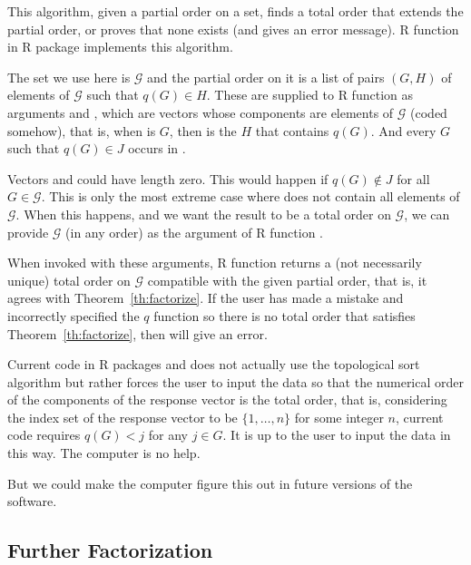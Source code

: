 This algorithm, given a partial order on a set, finds a total order that
extends the partial order, or proves that none exists (and gives an error
message).
R function  in R package 
\citep{pooh-package} implements this algorithm.

The set we use here is $\mathcal{G}$ and the partial order on it is
a list of pairs $(G, H)$ of elements of $\mathcal{G}$ such that
$q(G) \in H$.  These are supplied to R function  as arguments
 and , which are vectors whose components are elements
of $\mathcal{G}$ (coded somehow), that is, when 
is $G$, then  is the $H$ that contains $q(G)$.
And every $G$ such that $q(G) \in J$ occurs in .

Vectors  and  could have length zero.  This would happen
if $q(G) \notin J$ for all $G \in \mathcal{G}$.  This is only the most extreme
case where  does not contain all elements of $\mathcal{G}$.
When this happens, and we want the result to be a total order on $\mathcal{G}$,
we can provide $\mathcal{G}$ (in any order) as the  argument of
R function .

When invoked with these arguments, R function  returns
a (not necessarily unique) total order on $\mathcal{G}$ compatible with
the given partial order, that is, it agrees with
Theorem~\ref{th:factorize}.  If the user has made a mistake and incorrectly
specified the $q$ function so there is no total order that satisfies
Theorem~\ref{th:factorize}, then  will give an error.

Current code in R packages  and  does not
actually use the topological sort algorithm but rather forces the user
to input the data so that the numerical order of the components of the
response vector is the total order, that is, considering the index set
of the response vector to be $\{1, \ldots, n\}$ for some integer $n$,
current code requires $q(G) < j$ for any $j \in G$.
It is up to the user to input the data in this way.  The computer is no help.

But we could make the computer figure this out in future versions of the
software.

\subsection{Further Factorization}
\label{sec:further-factorize}

